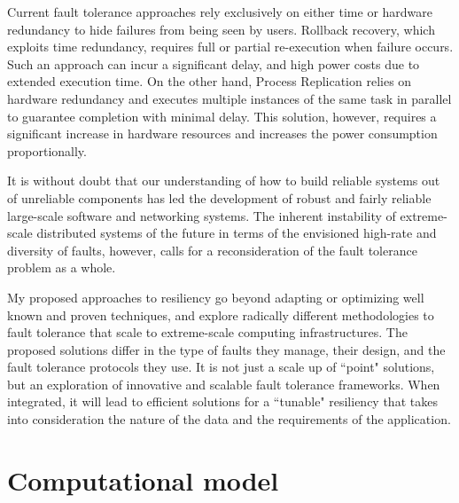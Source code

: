 Current fault tolerance approaches rely exclusively on either time or hardware redundancy to hide failures from being seen by users. 
Rollback recovery, which exploits time redundancy, requires full or partial re-execution when failure occurs. 
Such an approach
can incur a significant delay, %
and high power costs due to extended execution time.
On the other hand, Process Replication relies on hardware redundancy and executes multiple
instances of the same task in parallel to guarantee completion with minimal delay.  %
This solution, however, requires a significant increase in hardware resources and increases the power consumption proportionally. 

It is without doubt that our understanding of how to build reliable systems out of unreliable components has led the development of robust and fairly reliable large-scale software and networking systems. The inherent instability of extreme-scale distributed systems of the future in terms of the envisioned high-rate and diversity of faults, however, calls for a reconsideration of the fault tolerance problem as a whole. %

My proposed approaches to resiliency go beyond adapting or optimizing well known and proven techniques, and explore radically different methodologies to fault tolerance that scale to extreme-scale computing infrastructures. The proposed solutions differ in the type of faults they manage, their design, and the fault tolerance protocols they use. It is not just a scale up of  ``point" solutions, but an exploration of innovative and scalable fault tolerance frameworks. When integrated, it will lead to efficient solutions for a ``tunable" resiliency that takes into consideration the nature of the data and the requirements of the application.

\section{Computational model}

